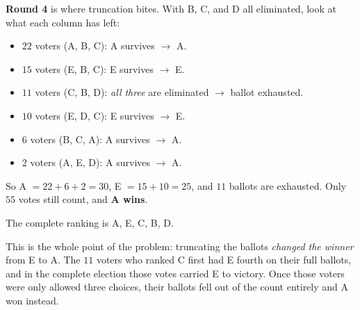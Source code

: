 \documentclass[12pt]{ximera}
\begin{document}
\begin{problem}
\begin{prompt}
\begin{feedback}
\textbf{Round 4} is where truncation bites. With B, C, and D all eliminated, look at
what each column has left:
\begin{itemize}
\item $22$ voters (A, B, C): A survives $\to$ A.
\item $15$ voters (E, B, C): E survives $\to$ E.
\item $11$ voters (C, B, D): \emph{all three} are eliminated $\to$ ballot exhausted.
\item $10$ voters (E, D, C): E survives $\to$ E.
\item $6$ voters (B, C, A): A survives $\to$ A.
\item $2$ voters (A, E, D): A survives $\to$ A.
\end{itemize}
So A $= 22+6+2 = 30$, E $= 15+10 = 25$, and $11$ ballots are exhausted. Only $55$
votes still count, and \textbf{A wins}.

The complete ranking is A, E, C, B, D.

This is the whole point of the problem: truncating the ballots \emph{changed the
winner} from E to A. The $11$ voters who ranked C first had E fourth on their full
ballots, and in the complete election those votes carried E to victory. Once those
voters were only allowed three choices, their ballots fell out of the count entirely
and A won instead.
\end{feedback}
\end{prompt}
\end{problem}
\end{document}
